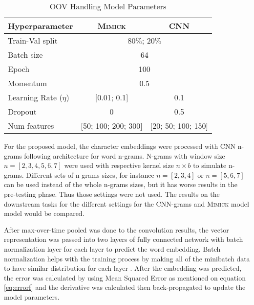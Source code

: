         \begin{table}[]
            \centering
            \caption{OOV Handling Model Parameters}
            \label{tab:hyperparameter}
            \begin{tabular}{@{}lcc@{}}
                \toprule
                \textbf{Hyperparameter} & \multicolumn{1}{c}{\textbf{\textsc{Mimick}}} & \multicolumn{1}{c}{\textbf{CNN}} \\ \midrule
                Train-Val split & \multicolumn{2}{c}{$80\%$; $20\%$}\\
                Batch size & \multicolumn{2}{c}{64} \\
                Epoch & \multicolumn{2}{c}{100} \\
                Momentum & \multicolumn{2}{c}{0.5} \\
                Learning Rate ($\eta$) & [0.01; 0.1] & 0.1 \\
                Dropout & 0 & 0.5 \\
                Num features & [50; 100; 200; 300] & [20; 50; 100; 150] \\ \bottomrule
            \end{tabular}
        \end{table}

        For the proposed model, the character embeddings were
        processed with CNN n-grams following
        \cite{convolutional2014kim} architecture for word n-grams.
        N-grams with window size $n = [2, 3, 4, 5, 6, 7]$ were used
        with respective kernel size $n \times b$ to simulate n-grams.
        Different sets of n-grams sizes, for instance $n = [2, 3, 4]$
        or $n = [5, 6, 7]$ can be used instead of the whole n-grams
        sizes, but it has worse results in the pre-testing phase. Thus
        those settings were not used. The results on the downstream
        tasks for the different settings for the CNN-grams and \textsc{Mimick} model
        model would be compared.

        After max-over-time pooled was done to the convolution results, 
        the vector representation was
        passed into two layers of fully connected network with batch
        normalization layer for each layer to predict the 
        word embedding. Batch normalization helps with the training
        process by making all of the minibatch data to have similar
        distribution for each layer
        \citep{batchnorm:DBLP:journals/corr/IoffeS15}. After the
        embedding was predicted, the error was calculated by using Mean
        Squared Error as mentioned on equation \ref{eq:errorf} and the
        derivative was calculated then back-propagated to update the
        model parameters.

